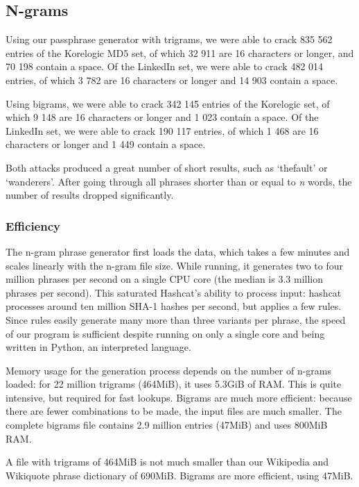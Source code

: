 \documentclass{article}
\begin{document}
\subsection{N-grams}


Using our passphrase generator with trigrams, we were able to crack 835 562
entries of the Korelogic MD5 set, of which 32 911 are 16 characters or longer,
and 70 198 contain a space. Of the LinkedIn set, we were able to crack 482 014
entries, of which 3 782 are 16 characters or longer and 14 903 contain a space.

Using bigrams, we were able to crack 342 145 entries of the Korelogic set, of
which 9 148 are 16 characters or longer and 1 023 contain a space. Of the
LinkedIn set, we were able to crack 190 117 entries, of which 1 468 are 16
characters or longer and 1 449 contain a space.

Both attacks produced a great number of short results, such as `thefault' or
`wanderers'. After going through all phrases shorter than or equal to {\it n}
words, the number of results dropped significantly.

\subsubsection{Efficiency}

The n-gram phrase generator first loads the data, which takes a few minutes and
scales linearly with the n-gram file size. While running, it generates two to
four million phrases per second on a single CPU core (the median is 3.3 million
phrases per second). This saturated Hashcat's ability to process input: hashcat
processes around ten million SHA-1 hashes per second, but applies a few rules.
Since rules easily generate many more than three variants per phrase, the speed
of our program is sufficient despite running on only a single core and being
written in Python, an interpreted language.

Memory usage for the generation process depends on the number of n-grams
loaded: for 22 million trigrams (464MiB), it uses 5.3GiB of RAM. This is quite
intensive, but required for fast lookups. Bigrams are much more efficient:
because there are fewer combinations to be made, the input files are much
smaller. The complete bigrams file contains 2.9 million entries (47MiB) and
uses 800MiB RAM.

A file with trigrams of 464MiB is not much smaller than our Wikipedia and
Wikiquote phrase dictionary of 690MiB. Bigrams are more efficient, using 47MiB.
\end{document}
